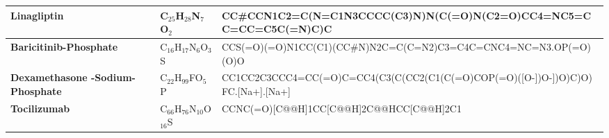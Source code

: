 \documentclass[conference]{IEEEtran}
\begin{document}
\begin{table}[h]
\begin{tabular}{|>{\bfseries}l|l|p{10cm}|}
    \hline
    Linagliptin                              & C$_{25}$H$_{28}$N$_7$O$_2$             & CC\#CCN1C2=C(N=C1N3CCCC(C3)N)N(C(=O)N(C2=O)CC4=NC5=CC=CC=C5C(=N\newline 4)C)C                                                                                                                                                                                                                                                                                                                                                                                                                                                                                                   \\
    \hline
    Baricitinib-Phosphate                    & C$_{16}$H$_{17}$N$_6$O$_3$S            & CCS(=O)(=O)N1CC(C1)(CC\#N)N2C=C(C=N2)C3=C4C=CNC4=NC=N3.OP(=O)(O)O                                                                                                                                                                                                                                                                                                                                                                                                                                                                                                               \\
    \hline
    Dexamethasone \newline -Sodium-Phosphate & C$_{22}$H$_{99}$FO$_5$P                & CC1CC2C3CCC4=CC(=O)C=CC4(C3(C(CC2(C1(C(=O)COP(=O)([O-])O-])O)C)O) \newline FC.[Na+].[Na+]                                                                                                                                                                                                                                                                                                                                                                                                                                                                                       \\
    \hline
    Tocilizumab                              & C$_{66}$H$_{76}$N$_{10}$O$_{16}$S      & CCNC(=O)[C@@H]1CC[C@@H]2C@@HCC[C@@H]2C1                                                                                                                                                                                                                                                                                                                                                                                                                                                                                                                                         \\

\end{tabular}
\end{table}
\end{document}
